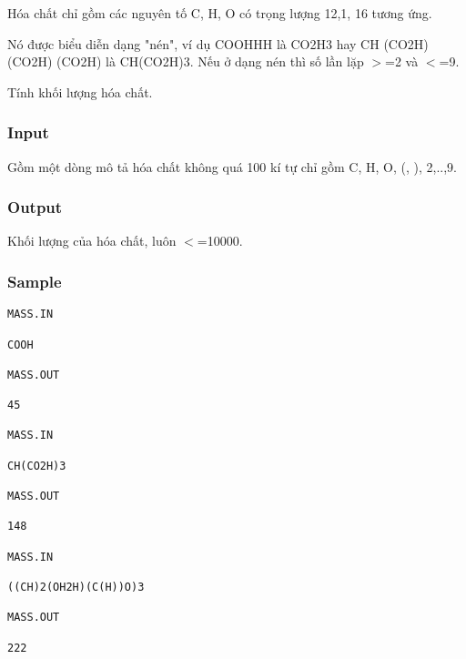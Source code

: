 



   Hóa chất chỉ gồm các nguyên tố C, H, O có trọng lượng 12,1, 16 tương ứng.  

   Nó được biểu diễn dạng "nén", ví dụ COOHHH là CO2H3  hay CH (CO2H) (CO2H) (CO2H) là CH(CO2H)3. Nếu ở dạng nén thì số lần lặp $>$=2 và $<$=9.  

   Tính khối lượng hóa chất.  



\subsubsection{   Input  }



   Gồm một dòng mô tả hóa chất không quá 100 kí tự chỉ gồm C, H, O, (, ), 2,..,9.  



\subsubsection{   Output  }



   Khối lượng của hóa chất, luôn $<$=10000.  



\subsubsection{   Sample  }
\begin{verbatim}
MASS.IN

COOH

MASS.OUT

45
 
MASS.IN

CH(CO2H)3

MASS.OUT

148
 
MASS.IN

((CH)2(OH2H)(C(H))O)3

MASS.OUT

222
 

\end{verbatim}